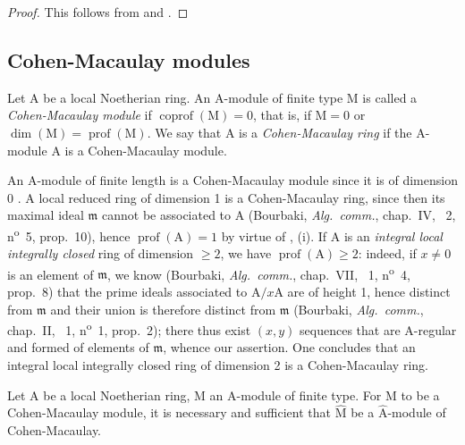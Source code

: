 \begin{proof}
This follows from  and .
\end{proof}

\subsection{Cohen-Macaulay modules}
\label{subsection:0.16.5}

\begin{definition}[16.5.1]
\label{0.16.5.1}
Let $\mathrm{A}$ be a local Noetherian ring.
An $\mathrm{A}$-module of finite type $\mathrm{M}$ is called a \emph{Cohen-Macaulay module} if $\operatorname{coprof}(\mathrm{M})=0$, that is, if $\mathrm{M}=0$ or $\dim(\mathrm{M})=\operatorname{prof}(\mathrm{M})$.
We say that $\mathrm{A}$ is a \emph{Cohen-Macaulay ring} if the $\mathrm{A}$-module $\mathrm{A}$ is a Cohen-Macaulay module.
\end{definition}

An $\mathrm{A}$-module of finite length is a Cohen-Macaulay module since it is of dimension 0 .
A local reduced ring of dimension 1 is a Cohen-Macaulay ring, since then its maximal ideal $\mathfrak{m}$ cannot be associated to $\mathrm{A}$ (Bourbaki, \emph{Alg.~comm.}, chap.~IV, \textsection~2, n\textsuperscript{o}~5, prop.~10), hence $\operatorname{prof}(\mathrm{A})=1$ by virtue of , (i).
If $\mathrm{A}$ is an \emph{integral local integrally closed} ring of dimension $\geq 2$, we have $\operatorname{prof}(\mathrm{A})\geq 2$: indeed, if $x\neq 0$ is an element of $\mathfrak{m}$, we know (Bourbaki, \emph{Alg.~comm.}, chap.~VII, \textsection~1, n\textsuperscript{o}~4, prop.~8) that the prime ideals associated to $\mathrm{A}/x\mathrm{A}$ are of height 1, hence distinct from $\mathfrak{m}$ and their union is therefore distinct from $\mathfrak{m}$ (Bourbaki, \emph{Alg.~comm.}, chap.~II, \textsection~1, n\textsuperscript{o}~1, prop.~2); there thus exist $(x,y)$ sequences that are $\mathrm{A}$-regular and formed of elements of $\mathfrak{m}$, whence our assertion.
One concludes that an integral local integrally closed ring of dimension 2 is a Cohen-Macaulay ring.

\begin{proposition}[16.5.2]
\label{0.16.5.2}
Let $\mathrm{A}$ be a local Noetherian ring, $\mathrm{M}$ an $\mathrm{A}$-module of finite type.
For $\mathrm{M}$ to be a Cohen-Macaulay module, it is necessary and sufficient that $\widehat{\mathrm{M}}$ be a $\widehat{\mathrm{A}}$-module of Cohen-Macaulay.
\end{proposition}


